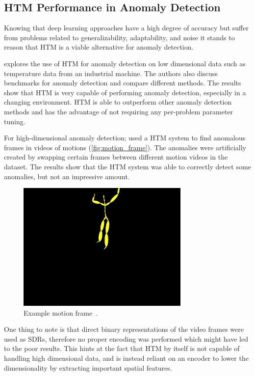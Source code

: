 \subsection{HTM Performance in Anomaly Detection}
\label{sec:htm_perf}
Knowing that deep learning approaches have a high degree of accuracy but suffer from problems related to generalizability, adaptability, and noise it stands to reason that HTM is a viable alternative for anomaly detection.\par
\textcite{AHMAD2017134} explores the use of HTM for anomaly detection on low dimensional data such as temperature data from an industrial machine. The authors also discuss benchmarks for anomaly detection and compare different methods. The results show that HTM is very capable of performing anomaly detection, especially in a changing environment. HTM is able to outperform other anomaly detection methods and has the advantage of not requiring any per-problem parameter tuning.
\par
For high-dimensional anomaly detection; \textcite{MotionAnomalyDetection} used a HTM system to find anomalous frames in videos of motions (\autoref{fig:motion_frame}). The anomalies were artificially created by swapping certain frames between different motion videos in the dataset. The results show that the HTM system was able to correctly detect some anomalies, but not an impressive amount.
\begin{figure}[H]
    \centering
    \includegraphics[width=0.5\linewidth]{resources/related_works/motion_frame.png}
    \caption[Example Motion Frame]{Example motion frame~\cite{MotionAnomalyDetection}.}
    \label{fig:motion_frame}
\end{figure}
One thing to note is that direct binary representations of the video frames were used as SDRs, therefore no proper encoding was performed which might have led to the poor results. This hints at the fact that HTM by itself is not capable of handling high dimensional data, and is instead reliant on an encoder to lower the dimensionality by extracting important spatial features.
